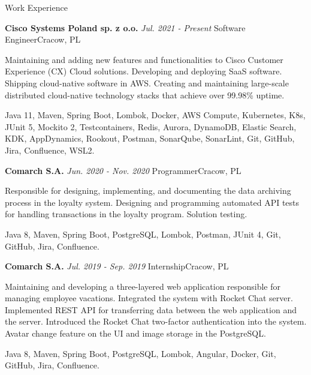\documentclass{resume}
\begin{document}

\begin{rSection}{Work Experience}

\begin{rSubsection}
    {\bf Cisco Systems Poland sp. z o.o.}
    {\em Jul. 2021 - Present}
    {\normalfont Software Engineer}{Cracow, PL}

    \item[] {Maintaining and adding new features and functionalities to Cisco Customer Experience (CX) Cloud solutions.
    Developing and deploying SaaS software. Shipping cloud-native software in AWS.
    Creating and maintaining large-scale distributed cloud-native technology stacks that achieve over 99.98\% uptime.}
    \item[] {Java 11, Maven, Spring Boot, Lombok, Docker, AWS Compute, Kubernetes, K8s, JUnit 5, Mockito 2, Testcontainers, Redis, Aurora, DynamoDB,
    Elastic Search, KDK, AppDynamics, Rookout, Postman, SonarQube, SonarLint, Git, GitHub, Jira, Confluence, WSL2.}

\end{rSubsection}

\begin{rSubsection}
    {\bf Comarch S.A.}
    {\em Jun. 2020 - Nov. 2020}
    {\normalfont Programmer}{Cracow, PL}

    \item[] {Responsible for designing, implementing, and documenting the data archiving process in the loyalty system. Designing and programming
    automated API tests for handling transactions in the loyalty program. Solution testing.}
    \item[] {Java 8, Maven, Spring Boot, PostgreSQL, Lombok, Postman, JUnit 4, Git, GitHub, Jira, Confluence.}

\end{rSubsection}

\begin{rSubsection}
    {\bf Comarch S.A.}
    {\em Jul. 2019 - Sep. 2019}
    {\normalfont Internship}{Cracow, PL}

    \item[] {Maintaining and developing a three-layered web application responsible for managing employee vacations.
    Integrated the system with Rocket Chat server. Implemented REST API for transferring data between the web
    application and the server. Introduced the Rocket Chat two-factor authentication into the system.
    Avatar change feature on the UI and image storage in the PostgreSQL.}
    \item[] {Java 8, Maven, Spring Boot, PostgreSQL, Lombok, Angular, Docker, Git, GitHub, Jira, Confluence.}


\end{rSubsection}
\end{rSection}
\end{document}
